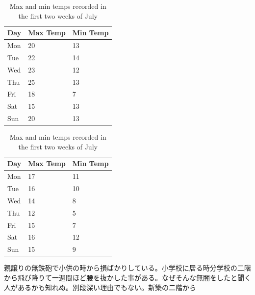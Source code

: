 \begin{table}[H]
    \begin{subtable}[h]{0.45\textwidth}
        \centering
        \begin{tabular}{l  l  l}
            \toprule
            Day & Max Temp & Min Temp \\
            \midrule
            Mon & 20       & 13       \\
            Tue & 22       & 14       \\
            Wed & 23       & 12       \\
            Thu & 25       & 13       \\
            Fri & 18       & 7        \\
            Sat & 15       & 13       \\
            Sun & 20       & 13       \\
            \bottomrule
        \end{tabular}
        \caption{First Week}
        \label{tab:week1}
    \end{subtable}
    \hfill
    \begin{subtable}[h]{0.45\textwidth}
        \centering
        \begin{tabular}{l  l l}
            \toprule
            Day & Max Temp & Min Temp \\
            \midrule
            Mon & 17       & 11       \\
            Tue & 16       & 10       \\
            Wed & 14       & 8        \\
            Thu & 12       & 5        \\
            Fri & 15       & 7        \\
            Sat & 16       & 12       \\
            Sun & 15       & 9        \\
            \bottomrule
        \end{tabular}
        \caption{Second Week}
        \label{tab:week2}
    \end{subtable}
    \caption{Max and min temps recorded in the first two weeks of July}
    \label{tab:temps}
\end{table}

親譲りの無鉄砲で小供の時から損ばかりしている。小学校に居る時分学校の二階から飛び降りて一週間ほど腰を抜かした事がある。なぜそんな無闇をしたと聞く人があるかも知れぬ。別段深い理由でもない。新築の二階から


